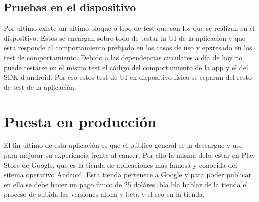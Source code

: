 \documentclass[../pfc.tex]{subfiles}
\begin{document}
	\subsection{Pruebas en el dispositivo}
	
	Por ultimo existe un ultimo bloque  o tipo de test que son los que se realizan en el dispositivo. Estos se encargan sobre todo de testar la UI de la aplicación y que esta responde al comportamiento prefijado en los casos de uso y epxresado en los test de comportamiento. Debido a las dependencias circulares a día de hoy no puede testarse en el mismo test el código del comportamiento de la app y el del SDK d android. Por eso estos test de UI en dispositivo físico se separan del resto de test de la aplicación.
	
	\section{Puesta en producción}	
	
	El fin último de esta aplicación es que el público general se la descargue y use para mejorar su experiencia frente al cancer. Por ello la misma debe estar en Play Store de Google, que es la tienda de aplicaciones más famosa y conocida del sitema operativo Android. Esta tienda pertenece a Google y para poder publicar en ella se debe hacer un pago único de 25 doláres. bla bla hablar de la tienda el proceso de subida las versiones alpha y beta y el seo en la tienda.
	
\end{document}
